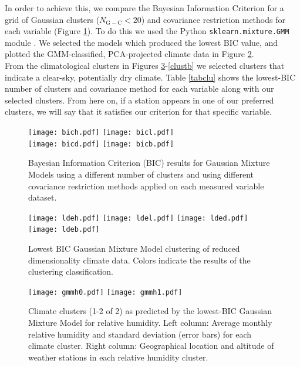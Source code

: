 \documentclass[12pt]{iopart}
\begin{document}
In order to achieve this, we compare the Bayesian Information Criterion \cite{bicref} for a grid of Gaussian clusters ($N_\mathrm{G-C}<20$) and covariance restriction methods for each variable (Figure \ref{bic}). To do this we used the Python \texttt{sklearn.mixture.GMM} module \cite{sklearn}. We selected the models which produced the lowest BIC value, and plotted the GMM-classified, PCA-projected climate data in Figure \ref{lde}. \\

From the climatological clusters in Figures \ref{clusth}-\ref{clustb} we selected clusters that indicate a clear-sky, potentially dry climate. Table \ref{tabclu} shows the lowest-BIC number of clusters and covariance method for each variable along with our selected clusters. From here on, if a station appears in one of our preferred clusters, we will say that it satisfies our criterion for that specific variable.\\

\begin{figure}
\begin{center}
\texttt{[image: bich.pdf]}
\texttt{[image: bicl.pdf]}\\
\texttt{[image: bicd.pdf]}
\texttt{[image: bicb.pdf]}
\caption{Bayesian Information Criterion (BIC) results for Gaussian Mixture Models using a different number of clusters and using different covariance restriction methods \cite{sklearn} applied on each measured variable dataset.}\label{bic}
\end{center}
\end{figure}





\begin{figure}
\begin{center}
\texttt{[image: ldeh.pdf]}
\texttt{[image: ldel.pdf]}
\texttt{[image: lded.pdf]}
\texttt{[image: ldeb.pdf]}
\caption{Lowest BIC Gaussian Mixture Model clustering of reduced dimensionality climate data. Colors indicate the results of the clustering classification.}\label{lde}
\end{center}
\end{figure}

\begin{figure}
\begin{center}
\texttt{[image: gmmh0.pdf]}
\texttt{[image: gmmh1.pdf]}
\caption{Climate clusters (1-2 of 2) as predicted by the lowest-BIC Gaussian Mixture Model for relative humidity. Left column: Average monthly relative humidity and standard deviation (error bars) for each climate cluster. Right column: Geographical location and altitude of weather stations in each relative humidity cluster.}\label{clusth}
\end{center}
\end{figure}
\end{document}

